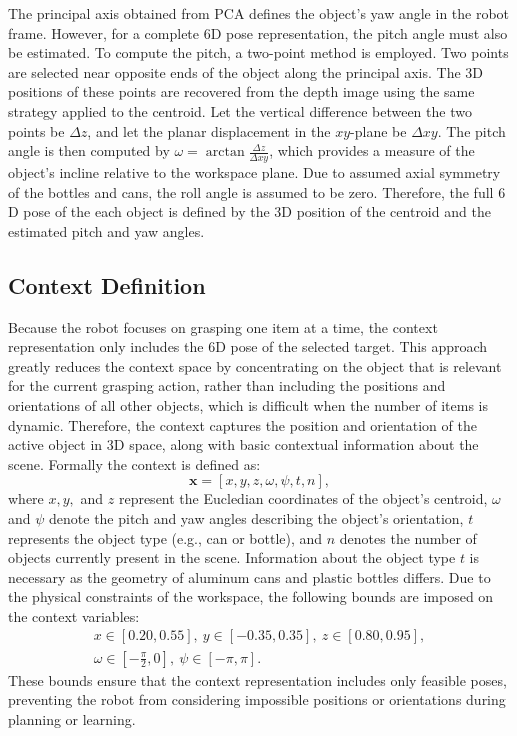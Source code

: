 \documentclass[./dissertation.tex]{subfiles}
\begin{document}
The principal axis obtained from PCA defines the object's yaw angle in the robot frame. However, for a complete $6$D pose representation, the pitch angle must also be estimated. To compute the pitch, a two-point method is employed. Two points are selected near opposite ends of the object along the principal axis. The $3$D positions of these points are recovered from the depth image using the same strategy applied to the centroid. Let the vertical difference between the two points be $\Delta z$, and let the planar displacement in the $xy$-plane be $\Delta xy$. The pitch angle is then computed by $\omega=\arctan{\frac{\Delta z}{\Delta xy}}$, which provides a measure of the object's incline relative to the workspace plane. Due to assumed axial symmetry of the bottles and cans, the roll angle is assumed to be zero. Therefore, the full $6$D pose of the each object is defined by the $3$D position of the centroid and the estimated pitch and yaw angles.

\subsection{Context Definition}
\label{Context Definition}
Because the robot focuses on grasping one item at a time, the context representation only includes the $6$D pose of the selected target. This approach greatly reduces the context space by concentrating on the object that is relevant for the current grasping action, rather than including the positions and orientations of all other objects, which is difficult when the number of items is dynamic. Therefore, the context captures the position and orientation of the active object in $3$D space, along with basic contextual information about the scene. Formally the context is defined as:
\[
\mathbf{x}=[x , y, z, \omega, \psi, t, n],
\]
where $x,y,$ and $z$ represent the Eucledian coordinates of the object's centroid, $\omega$ and $\psi$ denote the pitch and yaw angles describing the object's orientation, $t$ represents the object type (e.g., can or bottle), and $n$ denotes the number of objects currently present in the scene. Information about the object type $t$ is necessary as the geometry of aluminum cans and plastic bottles differs. Due to the physical constraints of the workspace, the following bounds are imposed on the context variables: 
\[
\begin{gathered}
x \in [0.20, 0.55], \
y \in [-0.35, 0.35], \
z \in [0.80, 0.95],  \\
\omega \in [-\frac{\pi}{2}, 0], \
\psi \in [-\pi, \pi].
\end{gathered}
\]
These bounds ensure that the context representation includes only feasible poses, preventing the robot from considering impossible positions or orientations during planning or learning.
\end{document}
